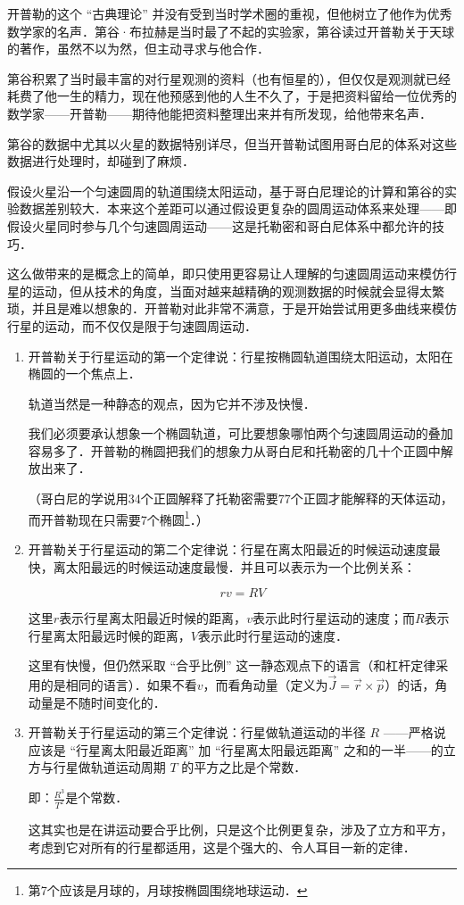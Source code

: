 开普勒的这个 “古典理论” 并没有受到当时学术圈的重视，但他树立了他作为优秀数学家的名声．第谷·布拉赫是当时最了不起的实验家，第谷读过开普勒关于天球的著作，虽然不以为然，但主动寻求与他合作．

第谷积累了当时最丰富的对行星观测的资料（也有恒星的），但仅仅是观测就已经耗费了他一生的精力，现在他预感到他的人生不久了，于是把资料留给一位优秀的数学家——开普勒——期待他能把资料整理出来并有所发现，给他带来名声．

第谷的数据中尤其以火星的数据特别详尽，但当开普勒试图用哥白尼的体系对这些数据进行处理时，却碰到了麻烦．

假设火星沿一个匀速圆周的轨道围绕太阳运动，基于哥白尼理论的计算和第谷的实验数据差别较大．本来这个差距可以通过假设更复杂的圆周运动体系来处理——即假设火星同时参与几个匀速圆周运动——这是托勒密和哥白尼体系中都允许的技巧．

这么做带来的是概念上的简单，即只使用更容易让人理解的匀速圆周运动来模仿行星的运动，但从技术的角度，当面对越来越精确的观测数据的时候就会显得太繁琐，并且是难以想象的．开普勒对此非常不满意，于是开始尝试用更多曲线来模仿行星的运动，而不仅仅是限于匀速圆周运动．

\begin{enumerate}
\item 

开普勒关于行星运动的第一个定律说：行星按椭圆轨道围绕太阳运动，太阳在椭圆的一个焦点上．

轨道当然是一种静态的观点，因为它并不涉及快慢．

我们必须要承认想象一个椭圆轨道，可比要想象哪怕两个匀速圆周运动的叠加容易多了．开普勒的椭圆把我们的想象力从哥白尼和托勒密的几十个正圆中解放出来了．

（哥白尼的学说用34个正圆解释了托勒密需要77个正圆才能解释的天体运动，而开普勒现在只需要7个椭圆\footnote{第7个应该是月球的，月球按椭圆围绕地球运动．}．）

\item

开普勒关于行星运动的第二个定律说：行星在离太阳最近的时候运动速度最快，离太阳最远的时候运动速度最慢．并且可以表示为一个比例关系：

\begin{equation}
r v = R V
\end{equation}

这里$r$表示行星离太阳最近时候的距离，$v$表示此时行星运动的速度；而$R$表示行星离太阳最远时候的距离，$V$表示此时行星运动的速度．

这里有快慢，但仍然采取 “合乎比例” 这一静态观点下的语言（和杠杆定律采用的是相同的语言）．如果不看$v$，而看角动量（定义为$\vec J = \vec r \times \vec p$）的话，角动量是不随时间变化的．

\item

开普勒关于行星运动的第三个定律说：行星做轨道运动的半径 $R$ ——严格说应该是 “行星离太阳最近距离” 加 “行星离太阳最远距离” 之和的一半——的立方与行星做轨道运动周期 $T$ 的平方之比是个常数．

即：$\frac{R^3}{T^2} $是个常数．

这其实也是在讲运动要合乎比例，只是这个比例更复杂，涉及了立方和平方，考虑到它对所有的行星都适用，这是个强大的、令人耳目一新的定律．

\end{enumerate}


